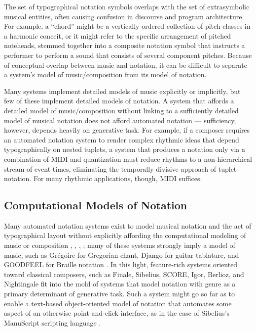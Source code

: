 The set of typographical notation symbols overlaps with the set of extrasymbolic musical entities, often causing confusion in discourse and program architecture. For example, a ``chord'' might be a vertically ordered collection of pitch-classes in a harmonic conceit, or it might refer to the specific arrangement of pitched noteheads, stemmed together into a composite notation symbol that instructs a performer to perform a sound that consists of several component pitches. Because of conceptual overlap between music and notation, it can be difficult to separate a system's model of music/composition from its model of notation.

Many systems implement detailed models of music explicitly or implicitly, but few of these implement detailed models of notation. A system that affords a detailed model of music/composition without linking to a sufficiently detailed model of musical notation does not afford automated notation --- sufficiency, however, depends heavily on generative task. For example, if a composer requires an automated notation system to render complex rhythmic ideas that depend typographically on nested tuplets, a system that produces a notation only via a combination of MIDI and quantization must reduce rhythms to a non-hierarchical stream of event times, eliminating the temporally divisive approach of tuplet notation. For many rhythmic applications, though, MIDI suffices. 

\subsection{Computational Models of Notation}

Many automated notation systems exist to model musical notation and the act of typographical layout without explicitly affording the computational modeling of music or composition \cite{Smith:1972mw}, \cite{Nienhuys:2003ve}, \cite{Hoos:1998bd}, \cite{hamel1noteability}; many of these systems strongly imply a model of music, such as Gr\'{e}goire for Gregorian chant, Django for guitar tablature, and GOODFEEL for Braille notation \cite{2006}. In this light, feature-rich systems oriented toward classical composers, such as Finale, Sibelius, SCORE, Igor, Berlioz, and Nightingale fit into the mold of systems that model notation with genre as a primary determinant of generative task. Such a system might go so far as to enable a text-based object-oriented model of notation that automates some aspect of an otherwise point-and-click interface, as in the case of Sibelius's ManuScript scripting language \cite{Technology:qc}. 

